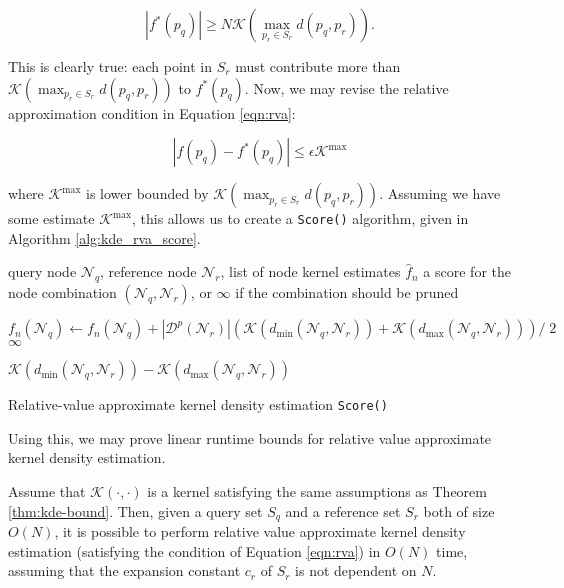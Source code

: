\begin{equation}
|f^*(p_q)| \ge N \mathcal{K}\left(\max_{p_r \in S_r} d(p_q, p_r)\right).
\end{equation}

This is clearly true: each point in $S_r$ must contribute more than
$\mathcal{K}(\max_{p_r \in S_r} d(p_q, p_r))$ to $f^*(p_q)$.  Now, we may revise
the relative approximation condition in Equation \ref{eqn:rva}:

\begin{equation}
| f(p_q) - f^*(p_q) | \le \epsilon \mathcal{K}^{\max}
\end{equation}

\noindent where $\mathcal{K}^{\max}$ is lower bounded by $\mathcal{K}(\max_{p_r
\in S_r} d(p_q, p_r))$.  Assuming we have some estimate $\mathcal{K}^{\max}$,
this allows us to create a \texttt{Score()} algorithm, given in Algorithm
\ref{alg:kde_rva_score}.

\begin{algorithm}[tb]
  \begin{algorithmic}[1]
     query node $\mathscr{N}_q$, reference node
$\mathscr{N}_r$, list of node kernel estimates $\hat{f}_n$
     a score for the node combination $(\mathscr{N}_q,
\mathscr{N}_r)$, or $\infty$ if the combination should be pruned

    \medskip

\label{alg:rva-kde-prune}
      \STATE $f_n(\mathscr{N}_q) \gets f_n(\mathscr{N}_q) + |
\mathscr{D}^p(\mathscr{N}_r) | \left(\mathcal{K}(d_{\min}(\mathscr{N}_q,
\mathscr{N}_r)) + \mathcal{K}(d_{\max}(\mathscr{N}_q, \mathscr{N}_r))\right)
/\;2$ \label{alg:rva-kde-update}
      \RETURN $\infty$
    \ENDIF

    \RETURN $\mathcal{K}(d_{\min}(\mathscr{N}_q, \mathscr{N}_r)) -
\mathcal{K}(d_{\max}(\mathscr{N}_q, \mathscr{N}_r))$
  \end{algorithmic}

  \caption{Relative-value approximate kernel density estimation
\texttt{Score()}}
  \label{alg:kde_rva_score}
\end{algorithm}

Using this, we may prove linear runtime bounds for relative value approximate
kernel density estimation.

\begin{thm}
Assume that $\mathcal{K}(\cdot, \cdot)$ is a kernel satisfying the same
assumptions as Theorem \ref{thm:kde-bound}.  Then, given a query set $S_q$ and a
reference set $S_r$ both of size $O(N)$, it is possible to perform relative
value approximate kernel density estimation (satisfying the condition of
Equation \ref{eqn:rva}) in $O(N)$ time, assuming that the expansion constant
$c_r$ of $S_r$ is not dependent on $N$.
\end{thm}

